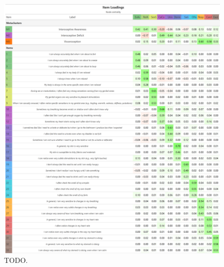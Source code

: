 \documentclass[
  jou,
  floatsintext,
  longtable,
  nolmodern,
  notxfonts,
  notimes,
  colorlinks=true,linkcolor=blue,citecolor=blue,urlcolor=blue]{apa7}
\begin{document}
\begin{figure}[!htbp]

{\caption{{TODO.}{\label{fig-three}}}}

\begin{center}
\includegraphics[width=1\linewidth,height=\textheight,keepaspectratio]{../study2/analysis/figures/table1.png}
\end{center}

\end{figure}
\end{document}
